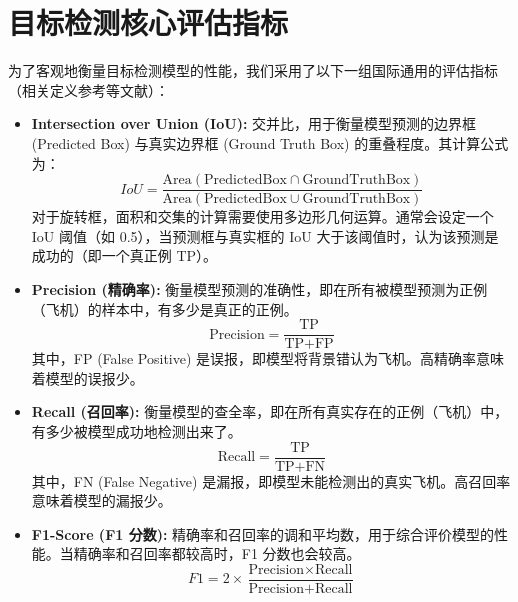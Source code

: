 \documentclass[12pt, a4paper]{report}
\begin{document}
\section{目标检测核心评估指标}
为了客观地衡量目标检测模型的性能，我们采用了以下一组国际通用的评估指标（相关定义参考\cite{focal_loss,iou}等文献）：
\begin{itemize}
    \item \textbf{Intersection over Union (IoU):} 交并比，用于衡量模型预测的边界框 (Predicted Box) 与真实边界框 (Ground Truth Box) 的重叠程度。其计算公式为：
    \begin{equation}
        IoU = \frac{\text{Area}(\text{PredictedBox} \cap \text{GroundTruthBox})}{\text{Area}(\text{PredictedBox} \cup \text{GroundTruthBox})}
    \end{equation}
    对于旋转框，面积和交集的计算需要使用多边形几何运算。通常会设定一个 IoU 阈值（如 0.5），当预测框与真实框的 IoU 大于该阈值时，认为该预测是成功的（即一个真正例 TP）。\cite{iou}

    \item \textbf{Precision (精确率):} 衡量模型预测的准确性，即在所有被模型预测为正例（飞机）的样本中，有多少是真正的正例。
    \begin{equation}
        \text{Precision} = \frac{\text{TP}}{\text{TP} + \text{FP}}
    \end{equation}
    其中，FP (False Positive) 是误报，即模型将背景错认为飞机。高精确率意味着模型的误报少。\cite{focal_loss}

    \item \textbf{Recall (召回率):} 衡量模型的查全率，即在所有真实存在的正例（飞机）中，有多少被模型成功地检测出来了。
    \begin{equation}
        \text{Recall} = \frac{\text{TP}}{\text{TP} + \text{FN}}
    \end{equation}
    其中，FN (False Negative) 是漏报，即模型未能检测出的真实飞机。高召回率意味着模型的漏报少。\cite{focal_loss}

    \item \textbf{F1-Score (F1 分数):} 精确率和召回率的调和平均数，用于综合评价模型的性能。当精确率和召回率都较高时，F1 分数也会较高。
    \begin{equation}
        F1 = 2 \times \frac{\text{Precision} \times \text{Recall}}{\text{Precision} + \text{Recall}}
    \end{equation}
    \cite{focal_loss}


\end{itemize}
\end{document}
